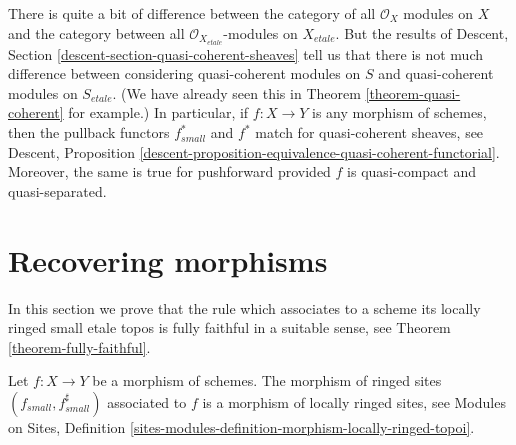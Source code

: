 \medskip\noindent
There is quite a bit of difference between the category
of all $\mathcal{O}_X$ modules on $X$ and the category between all
$\mathcal{O}_{X_{etale}}$-modules on $X_{etale}$. But the results of
Descent, Section \ref{descent-section-quasi-coherent-sheaves}
tell us that there is not much difference between considering quasi-coherent
modules on $S$ and quasi-coherent modules on $S_{etale}$.
(We have already seen this in
Theorem \ref{theorem-quasi-coherent}
for example.)
In particular, if $f : X \to Y$ is any morphism of schemes, then
the pullback functors $f_{small}^*$ and $f^*$ match for
quasi-coherent sheaves, see
Descent,
Proposition \ref{descent-proposition-equivalence-quasi-coherent-functorial}.
Moreover, the same is true for pushforward provided $f$ is
quasi-compact and quasi-separated.









\section{Recovering morphisms}
\label{section-morphisms}

\noindent
In this section we prove that the rule which associates to a scheme
its locally ringed small etale topos is fully faithful in a suitable
sense, see
Theorem \ref{theorem-fully-faithful}.

\begin{lemma}
\label{lemma-morphism-locally-ringed}
Let $f : X \to Y$ be a morphism of schemes.
The morphism of ringed sites $(f_{small}, f_{small}^\sharp)$
associated to $f$ is a morphism of locally ringed sites, see
Modules on Sites,
Definition \ref{sites-modules-definition-morphism-locally-ringed-topoi}.
\end{lemma}

